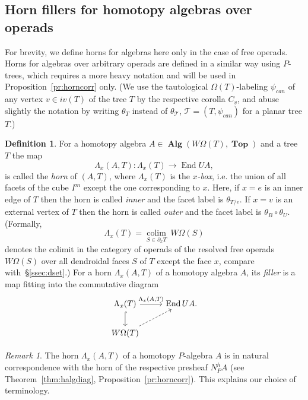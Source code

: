 \documentclass{amsart}
\theoremstyle{definition}
\newtheorem{definition}[formula]{Definition}
\theoremstyle{remark}
\newtheorem{remark}[formula]{Remark}
\DeclareMathOperator{\col}{colim}
\DeclareMathOperator{\Top}{\mathbf{Top}}
\DeclareMathOperator{\Alg}{\mathbf{Alg}}
\DeclareMathOperator{\End}{End}
\begin{document}
	\subsection{Horn fillers for homotopy algebras over operads}\label{ssec:hornext}
	
	For brevity, we define horns for algebras here only in the case of free operads.
	Horns for algebras over arbitrary operads are defined in a similar way using $P$-trees, which requires a more heavy notation and will be used in Proposition~\ref{pr:horncorr} only.
    (We use the tautological $\Omega(T)$-labeling $\psi_{can}$ of any vertex $v\in iv(T)$ of the tree $T$ by the respective corolla $C_v$, and abuse slightly the notation by writing $\theta_{T}$ instead of $\theta_{\mathcal{T}}$, $\mathcal{T}=(T,\psi_{can})$ for a planar tree $T$.)

	
	\begin{definition}\label{defn:alghorn}
		For a homotopy algebra $A\in \Alg(W\Omega(T),\Top)$ and a tree $T$ the map 
		\begin{equation}\label{eq:hornalg}
			\Lambda_{x}(A,T)\colon \Lambda_{x}(T)\to \End UA, 
		\end{equation}
		is called the \emph{horn} of $(A,T)$, where $\Lambda_{x}(T)$ is the \emph{$x$-box}, i.e. the union of all facets of the cube $I^{m}$ except the one corresponding to $x$.
		Here, if $x=e$ is an inner edge of $T$ then the horn is called \emph{inner} and the facet label is $\theta_{T/e}$.
		If $x=v$ is an external vertex of $T$ then the horn is called \emph{outer} and the facet label is $\theta_{B}\circ \theta_{U}$.
		(Formally, 
		\begin{equation}\label{eq:colhornop}
			\Lambda_{x}(T)=\underset{S\in \partial_{x} T}{\col}\  W\Omega(S)
		\end{equation}
		denotes the colimit in the category of operads of the resolved free operads $W\Omega(S)$ over all dendroidal faces $S$ of $T$ except the face $x$, compare with~\S\ref{ssec:dset}.)
		For a horn $\Lambda_{x}(A,T)$ of a homotopy algebra $A$, its \textit{filler} is a map fitting into the commutative diagram
		\[
		\begin{tikzcd}
			\Lambda_{x}(T)\arrow{r}{\Lambda_{x}(A,T)}\arrow[hook]{d} & \End UA.\\
			W\Omega(T)\arrow[dashed]{ru}
		\end{tikzcd}
		\]
	\end{definition}
	
	\begin{remark}
		The horn $\Lambda_{x}(A,T)$ of a homotopy $P$-algebra $A$ is in natural correspondence with the horn of the respective presheaf $N_{P}^{h} A$ (see Theorem~\ref{thm:halgdiag}, Proposition~\ref{pr:horncorr}). This explains our choice of terminology.
	\end{remark}
	
\end{document}
